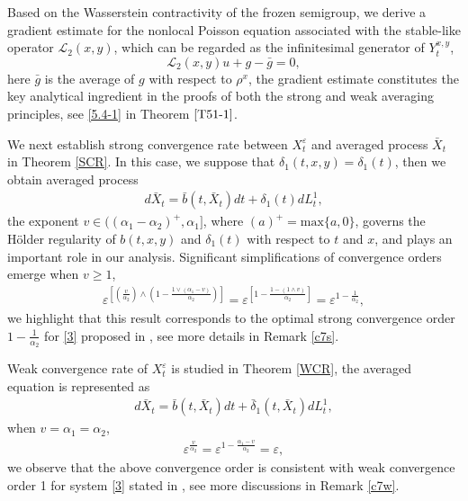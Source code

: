 \documentclass[11pt,reqno]{amsart}
\numberwithin{equation}{section}
\begin{document}
Based on the Wasserstein contractivity of the frozen semigroup, we derive a gradient estimate for the nonlocal Poisson equation associated with the stable-like operator $\mathcal{L}_2(x,y)$, which can be regarded as the infinitesimal generator of $Y_t^{x,y}$,
$$
\mathcal{L}_2(x,y)u+g-\bar g=0,
$$
here $\bar{g}$ is the average of $g$ with respect to $\rho^x$, the gradient estimate constitutes the key analytical ingredient in the proofs of both the strong and weak averaging principles, see \eqref{5.4-1} in Theorem $\ref{T51-1}$.



We next establish strong convergence rate between  $X_{t}^{\varepsilon}$ and averaged process $\bar{X}_{t}$ in Theorem \ref{SCR}. In this case, we suppose that  $\delta_{1}(t,x,y)=\delta_{1}(t)$, then we obtain averaged process 
\begin{align*}
	d\bar{X}_{t}=\bar{b}(t,\bar{X}_{t})dt+\delta_{1}(t)dL_{t}^{1},
\end{align*}
the exponent $v\in((\alpha_{1}-\alpha_{2})^{+},\alpha_{1}]$, where $(a)^{+}=\text{max}\{a, 0\}$, governs the Hölder regularity of $b(t,x,y)$ and $\delta_{1}(t)$ with respect to $t$ and $x$, and  plays an important role  in our analysis. Significant simplifications of convergence orders emerge when  $v\geq1$,  
\begin{align*}
	\varepsilon^{\left[ \left( \frac{v}{\alpha_{2}}\right) \wedge \left( 1-\frac{1\vee(\alpha_{1}-v)}{\alpha_{2}}\right) \right] }=\varepsilon^{\left[1-\frac{1-(1\wedge v)}{\alpha_{2}}\right]}=\varepsilon^{1-\frac{1}{\alpha_{2}}},
\end{align*}
we highlight that  this result corresponds to the optimal strong convergence order $1-\frac{1}{\alpha_2}$ for \eqref{3} proposed in \cite{SXX}, see more details in Remark \ref{c7s}.

Weak convergence rate of $X_{t}^{\varepsilon}$ is studied in Theorem \ref{WCR}, the averaged equation is represented as 
\begin{align*}
	d\bar{X}_{t}=\bar{b}(t,\bar{X}_{t})dt+\bar{\delta}_{1}(t,\bar{X}_{t})dL_{t}^{1},
\end{align*}
when $v=\alpha_{1}=\alpha_{2}$, 
\begin{align*}
\varepsilon^{\frac{v}{\alpha_{2}}}=\varepsilon^{1-\frac{\alpha_{1}-v}{\alpha_{2}}}=\varepsilon,
\end{align*}
we observe that the above convergence order is consistent with weak convergence order 1 for system \eqref{3} stated in \cite{SXX}, see more discussions in Remark \ref{c7w}.
\end{document}
